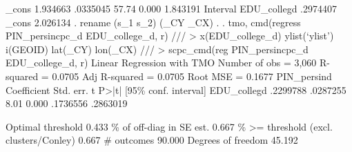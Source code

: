          _cons {\VBAR}  1.934663    .0335045   57.74    0.000    1.843191 
{\smallskip}
               {\VBAR}  Interval  
  EDU_colleg{\tytilde}d {\VBAR}  .2974407  
         _cons {\VBAR}  2.026134  
{\smallskip}
. rename (s_1 s_2) (_CY _CX)
{\smallskip}
. 
. tmo, cmd(regress PIN_persincpc_d EDU_college_d, r) ///
>     x(EDU_college_d) ylist(`ylist') i(GEOID) lat(_CY) lon(_CX) ///
>     scpc_cmd(reg PIN_persincpc_d EDU_college_d, r)
{\smallskip}
Linear Regression with TMO                              Number of obs =  3,060
                                                        R-squared     = 0.0705
                                                        Adj R-squared = 0.0705
                                                        Root MSE      = 0.1677
{\smallskip}
PIN_persin{\tytilde}d {\VBAR} Coefficient  Std. err.      t    P>|t|     [95\% conf. interval]
EDU_colleg{\tytilde}d {\VBAR}   .2299788   .0287255     8.01   0.000     .1736556    .2863019
                                                                               
                                                   Optimal threshold      0.433
                                            \% of off-diag in SE est.      0.667
                              \% >= threshold (excl. clusters/Conley)      0.667
                                                          \# outcomes     90.000
                                                  Degrees of freedom     45.192
